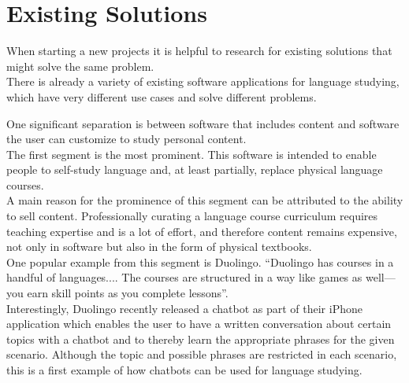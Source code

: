 \section{Existing Solutions} \label{existing}

When starting a new projects it is helpful to research for existing solutions that might solve the same problem.
\\
There is already a variety of existing software applications for language studying, which have very different use cases and solve different problems.

One significant separation is between software that includes content and software the user can customize to study personal content.
\\

The first segment is the most prominent. This software is intended to enable people to self-study language and, at least partially, replace physical language courses.
\\
A main reason for the prominence of this segment can be attributed to the ability to sell content.
Professionally curating a language course curriculum requires teaching expertise and is a lot of effort, and therefore content remains expensive, not only in software but also in the form of physical textbooks.
\\
One popular example from this segment is Duolingo. ``Duolingo has courses in a handful of languages.... The courses are structured in a way like games as well—you earn skill points as you complete lessons''\cite{lifehacker}.
\\
Interestingly, Duolingo recently released a chatbot\cite{topbots2} as part of their iPhone application which enables the user to have a written conversation about certain topics with a chatbot and to thereby learn the appropriate phrases for the given scenario. Although the topic and possible phrases are restricted in each scenario, this is a first example of how chatbots can be used for language studying.



